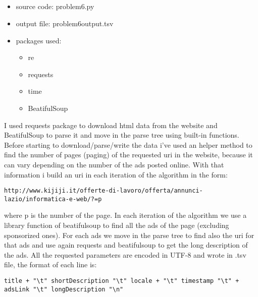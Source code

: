 \documentclass{article}
\begin{document}
\subsection{}
\begin{itemize}
	\item source code: problem6.py
	\item output file: problem6output.tsv
	\item packages used: 
		\begin{itemize}
			\item re
			\item requests
			\item time
			\item BeatifulSoup
		\end{itemize}
\end{itemize}

I used requests package to download html data from the website and BeatifulSoup to parse it and move in the parse tree using built-in functions. Before starting to download/parse/write the data i've used an helper method to find the number of pages (paging) of the requested uri in the website, because it can vary depending on the number of the ads posted online. With that information i build an uri in each iteration of the algorithm in the form: 
\begin{lstlisting} 
http://www.kijiji.it/offerte-di-lavoro/offerta/annunci-lazio/informatica-e-web/?=p
\end{lstlisting}
where p is the number of the page. In each iteration of the algorithm we use a library function of beatifulsoup to find all the ads of the page (excluding sponsorized ones). For each ads we move in the parse tree to find also the uri for that ads and use again requests and beatifulsoup to get the long description of the ads. All the requested parameters are encoded in UTF-8 and wrote in .tsv file, the format of each line is:
\begin{lstlisting} 
title + "\t" shortDescription "\t" locale + "\t" timestamp "\t" + adsLink "\t" longDescription "\n"
\end{lstlisting}
\end{document}
